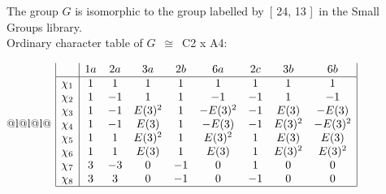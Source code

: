 \documentclass[varwidth=\maxdimen,border=10]{standalone}
\begin{document}
The group $G$ is isomorphic to the group labelled by\ [ 24, 13 ]\ in the Small Groups library.\\
Ordinary character table of $G$\ $\cong$\ C2 x A4:\\
\begin{center}
\begin{tabular}{@{}l@{}l@{}l@{}}
\hline
\(\begin{array}{|l|cccccccc|}
  & 1a & 2a & 3a & 2b & 6a & 2c & 3b & 6b\\ \hline
\chi_{1} & 1 & 1 & 1 & 1 & 1 & 1 & 1 & 1\\
\chi_{2} & 1 & -1 & 1 & 1 & -1 & -1 & 1 & -1\\
\chi_{3} & 1 & -1 & E(3)^{2} & 1 & -E(3)^{2} & -1 & E(3) & -E(3)\\
\chi_{4} & 1 & -1 & E(3) & 1 & -E(3) & -1 & E(3)^{2} & -E(3)^{2}\\
\chi_{5} & 1 & 1 & E(3)^{2} & 1 & E(3)^{2} & 1 & E(3) & E(3)\\
\chi_{6} & 1 & 1 & E(3) & 1 & E(3) & 1 & E(3)^{2} & E(3)^{2}\\
\chi_{7} & 3 & -3 & 0 & -1 & 0 & 1 & 0 & 0\\
\chi_{8} & 3 & 3 & 0 & -1 & 0 & -1 & 0 & 0\\
\hline
\end{array}\)\\
\end{tabular}
\end{center}
\end{document}

